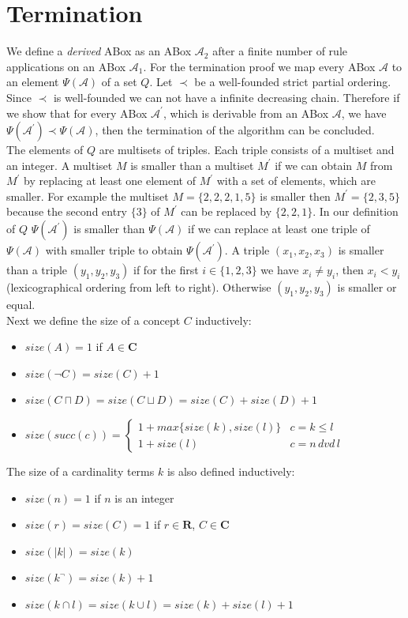 \documentclass{book}
\theoremstyle{break}
\theoremstyle{definition}
\begin{document}
\section{Termination}
We define a \textit{derived} ABox as an ABox $\mathcal{A}_2$ after a finite number of rule applications on an ABox $\mathcal{A}_1$. For the termination proof we map every ABox $\mathcal{A}$ to an element $\Psi(\mathcal{A})$ of a set $Q$. Let $\prec$ be a well-founded strict partial ordering. Since $\prec$ is well-founded we can not have a infinite decreasing chain. Therefore if we show that for every ABox $\mathcal{A}^\prime$, which is derivable from an ABox $\mathcal{A}$, we have $\Psi(\mathcal{A}^\prime)\prec\Psi(\mathcal{A})$, then the termination of the algorithm can be concluded.\\
The elements of $Q$ are multisets of triples. Each triple consists of a multiset and an integer. A multiset $M$ is smaller than a multiset $M^\prime$ if we can obtain $M$ from $M^\prime$ by replacing at least one element of $M^\prime$ with a set of elements, which are smaller. For example the multiset $M=\{2,2,2,1,5\}$ is smaller then $M^\prime=\{2,3,5\}$ because the second entry $\{3\}$ of $M^\prime$ can be replaced by $\{2,2,1\}$. In our definition of $Q$ $\Psi(\mathcal{A}^\prime)$ is smaller than $\Psi(\mathcal{A})$ if we can replace at least one triple of $\Psi(\mathcal{A})$ with smaller triple to obtain $\Psi(\mathcal{A}^\prime)$. A triple $(x_1,x_2, x_3)$ is smaller than a triple $(y_1,y_2,y_3)$ if for the first $i\in\{1,2,3\}$ we have $x_i\neq y_i$, then $x_i<y_i$ (lexicographical ordering from left to right). Otherwise $(y_1,y_2,y_3)$ is smaller or equal.\\
Next we define the size of a concept $C$ inductively:
\begin{itemize}
\item $size(A)=1$ if $A\in\mathbf{C}$
\item $size(\neg C)=size(C)+1$
\item $size(C\sqcap D)=size(C\sqcup D)= size(C)+ size(D)+1$
\item $size(succ(c))=\begin{cases}
1+max\{size(k),size(l)\} & c=k\leq l \\
1+size(l)& c= n\,dvd\,l
\end{cases}$
\end{itemize}
The size of a cardinality terms $k$ is also defined inductively:
\begin{itemize}
\item $size(n)=1$ if $n$ is an integer
\item $size(r)=size(C)=1$ if $r\in\mathbf{R}$, $C\in\mathbf{C}$
\item $size(|k|)=size(k)$
\item $size(k^\neg)=size(k)+1$
\item $size(k\cap l)=size(k\cup l)= size(k)+ size(l)+1$
\end{itemize}
\end{document}
